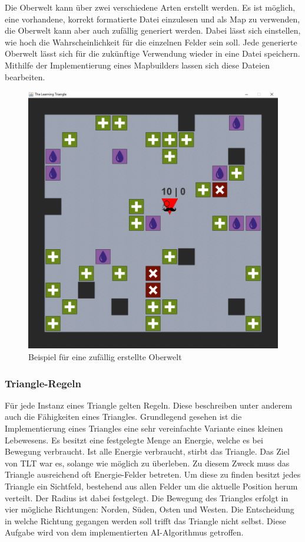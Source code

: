 Die Oberwelt kann über zwei verschiedene Arten erstellt werden. Es ist möglich, eine vorhandene, korrekt formatierte Datei einzulesen und als Map zu verwenden, die Oberwelt kann aber auch zufällig generiert werden. Dabei lässt sich einstellen, wie hoch die Wahrscheinlichkeit für die einzelnen Felder sein soll. Jede generierte Oberwelt lässt sich für die zukünftige Verwendung wieder in eine Datei speichern. Mithilfe der Implementierung eines Mapbuilders lassen sich diese Dateien bearbeiten.

\begin{figure}
\centering
\includegraphics[scale=0.5]{bilder/TLT_Game.PNG}
\caption{Beispiel für eine zufällig erstellte Oberwelt}
\label{BeispielMapTLT}
\end{figure}


\subsubsection{Triangle-Regeln}

Für jede Instanz eines Triangle gelten Regeln. Diese beschreiben unter anderem auch die Fähigkeiten eines Triangles. Grundlegend gesehen ist die Implementierung eines Triangles eine sehr vereinfachte Variante eines kleinen Lebewesens. Es besitzt eine festgelegte Menge an Energie, welche es bei Bewegung verbraucht. Ist alle Energie verbraucht, stirbt das Triangle. Das Ziel von TLT war es, solange wie möglich zu überleben. Zu diesem Zweck muss das Triangle ausreichend oft Energie-Felder betreten. Um diese zu finden besitzt jedes Triangle ein Sichtfeld, bestehend aus allen Felder um die aktuelle Position herum verteilt. Der Radius ist dabei festgelegt. Die Bewegung des Triangles erfolgt in vier mögliche Richtungen: Norden, Süden, Osten und Westen. Die Entscheidung in welche Richtung gegangen werden soll trifft das Triangle nicht selbst. Diese Aufgabe wird von dem implementierten AI-Algorithmus getroffen.

